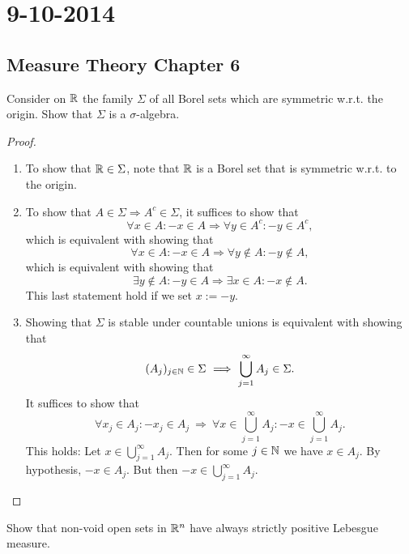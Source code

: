 \section{9-10-2014}

\subsection{Measure Theory Chapter 6}


\begin{thm}[Problem 6.1a]
Consider on \(\Bbb{R}\) the family \(\Sigma \) of all Borel sets which are symmetric w.r.t. the origin. Show that \(\Sigma \) is a \(\sigma \)-algebra.
\end{thm}

\begin{proof}

\begin{enumerate}
  \item To show that \(\Bbb{R}\in \Sigma \), note that \(\Bbb{R}\) is a Borel set that is symmetric w.r.t. to the origin.
  \item To show that \(A\in \Sigma \Rightarrow A^c\in \Sigma \), it suffices to show that
\[
\forall x\in A:-x\in A \Longrightarrow  \forall y\in A^c:-y\in A^c,
\]
which is equivalent with showing that
\[
\forall x\in A:-x\in A \Longrightarrow \forall y\not\in A : -y\not\in A,
\]
which is equivalent with showing that
\[
\exists y\not\in A:-y\in A \Longrightarrow \exists x\in A:-x\not\in A.
\]
This last statement hold if we set \(x:=-y.\)
  \item Showing that \(\Sigma \) is stable under countable unions is equivalent with showing that
\[
(A_{j})_{j\in \Bbb{N}}\in \Sigma \  \Longrightarrow \  \bigcup _{j=1}^\infty A_{j}\in \Sigma .
\]
It suffices to show that
\[
\forall x_{j}\in A_{j}:-x_{j}\in A_{j}\  \Longrightarrow \  \forall x\in \bigcup _{j=1}^\infty A_{j} :-x\in \bigcup _{j=1}^\infty A_{j}.
\]
This holds: Let \(x\in \bigcup _{j=1}^\infty A_{j}\). Then for some \(j\in \Bbb{N}\) we have \(x\in A_{j}\). By hypothesis, \(-x\in A_{j}.\) But then \(-x\in \bigcup _{j=1}^\infty A_{j}.\)

\end{enumerate}
\end{proof}
%

\newpage
\begin{thm}[Problem 6.3i]
Show that non-void open sets in \(\Bbb{R}^n\) have always strictly positive Lebesgue measure.
\end{thm}

